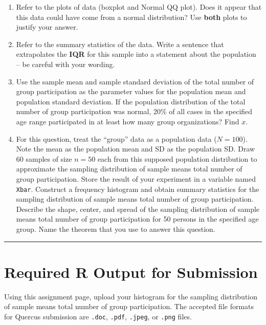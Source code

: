 \documentclass[oneside,openany]{book}
\begin{document}
\begin{enumerate}
\def\labelenumi{\arabic{enumi}.}
\item
  Refer to the plots of data (boxplot and Normal QQ plot). Does it appear that this data could have come from a normal distribution? Use \textbf{both} plots to justify your answer.
\item
  Refer to the summary statistics of the data. Write a sentence that extrapolates the \textbf{IQR} for this sample into a statement about the population -- be careful with your wording.
\item
  Use the sample mean and sample standard deviation of the total number of group participation as the parameter values for the population mean and population standard deviation. If the population distribution of the total number of group participation was normal, 20\% of all cases in the specified age range participated in at least how many group organizations? Find \(x\).
\item
  For this question, treat the ``group'' data as a population data (\(N = 100\)). Note the mean as the population mean and SD as the population SD. Draw 60 samples of size \(n = 50\) each from this supposed population distribution to approximate the sampling distribution of sample means total number of group participation. Store the result of your experiment in a variable named \texttt{Xbar}. Construct a frequency histogram and obtain summary statistics for the sampling distribution of sample means total number of group participation. Describe the shape, center, and spread of the sampling distribution of sample means total number of group participation for 50 persons in the specified age group. Name the theorem that you use to answer this question.
\end{enumerate}

\begin{center}\rule{0.5\linewidth}{0.5pt}\end{center}

\section{Required R Output for Submission}\label{required-r-output-for-submission}

Using this assignment page, upload your histogram for the sampling distribution of sample means total number of group participation. The accepted file formats for Quercus submission are \texttt{.doc}, \texttt{.pdf}, \texttt{.jpeg}, or \texttt{.png} files.
\end{document}
